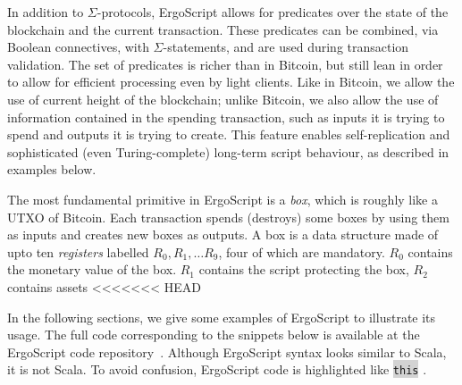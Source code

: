 \documentclass[11pt]{article}
\newcommand\Hi[2][lightgray]{%
	\hspace*{-\fboxsep}%
	\colorbox{#1}{#2}%
	\hspace*{-\fboxsep}%
}
\newcommand{\authnote}[2]{\marginpar{\parbox{\marginparwidth}{\tiny %
  \textsf{#1 {\textcolor{blue}{notes: #2}}}}}%
  \textcolor{blue}{\textbf{\dag}}}
\newcommand{\authnote}[2]{
  \textsf{#1 \textcolor{blue}{: #2}}}
\newcommand{\authnote}[2]{}
\newcommand{\lnote}[1]{{\authnote{\textcolor{orange}{Leo notes}}{#1}}}
\newcommand{\snote}[1]{{\authnote{\textcolor{yellow}{Scalahub notes}}{#1}}}
\newcommand{\langname}{ErgoScript\xspace}
\begin{document}
In addition to $\Sigma$-protocols, \langname allows for predicates over the state of the blockchain and the current transaction. These predicates can be combined, via Boolean connectives, with $\Sigma$-statements, and are used during transaction validation. The set of predicates is richer than in Bitcoin, but still lean in order to allow for efficient processing even by light clients. Like in Bitcoin, we allow the use of current height of the blockchain; unlike Bitcoin, we also allow the use of information contained in the spending transaction, such as inputs it is trying to spend and outputs it is trying to create. This feature enables self-replication and sophisticated (even Turing-complete) long-term script behaviour, as described in examples below.





The most fundamental primitive in \langname is a \emph{box}, which is roughly like a UTXO of Bitcoin. Each transaction spends (destroys) some boxes by using them as inputs and creates new boxes as outputs. A box is a data structure made of upto ten {\em registers} labelled $R_0, R_1,\ldots R_9$, four of which are mandatory. 
$R_0$ contains the monetary value of the box. $R_1$ contains the script protecting the box, $R_2$ contains assets 
<<<<<<< HEAD

In the following sections, we give some examples of \langname to illustrate its usage. The full code corresponding to the snippets below is available at the \langname code repository~\cite{langrepo}. 
Although \langname syntax looks similar to Scala, it is not Scala. To avoid confusion, \langname code is highlighted like \Hi{\texttt{this}}. 
\end{document}
